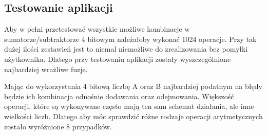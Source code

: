 \documentclass[12pt, a4paper, onside, polish]{article}				%
\begin{document}
\subsection{Testowanie aplikacji}
\hspace{\parindent}
Aby w pełni przetestować wszystkie możliwe kombinacje w sumatorze/subtraktorze 4 bitowym należałoby wykonać 1024 operacje. Przy tak dużej ilości zestawień jest to niemal niemożliwe do zrealizowania bez pomyłki użytkownika. Dlatego przy testowaniu aplikacji zostały wyszczególnione najbardziej wrażliwe fuzje.  

Mając do wykorzystania 4 bitową liczbę A oraz B najbardziej podatnym na błędy będzie ich kombinacja odnośnie dodawania oraz odejmowania. Większość operacji, które są wykonywane często mają ten sam schemat działania, ale inne wielkości liczb. Dlatego aby móc sprawdzić różne rodzaje operacji arytmetycznych zostało wyróżnione 8 przypadków.  
\end{document}
